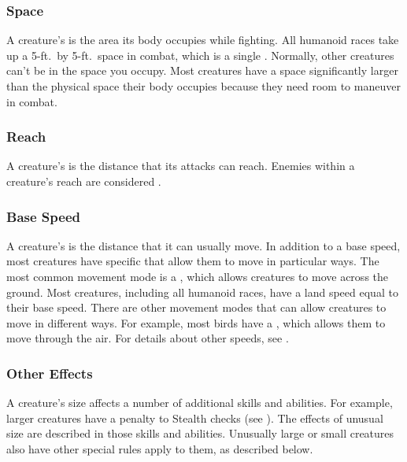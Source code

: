         \subsubsection{Space}\label{Space}
            A creature's  is the area its body occupies while fighting.
            All humanoid races take up a 5-ft.\ by 5-ft.\ space in combat, which is a single .
            Normally, other creatures can't be in the space you occupy.
            Most creatures have a space significantly larger than the physical space their body occupies because they need room to maneuver in combat.

        \subsubsection{Reach}\label{Reach}
            A creature's  is the distance that its  attacks can reach.
            Enemies within a creature's reach are considered .

        \subsubsection{Base Speed}\label{Base Speed}
            A creature's  is the distance that it can usually move.
            In addition to a base speed, most creatures have specific  that allow them to move in particular ways.
            The most common movement mode is a , which allows creatures to move across the ground.
            Most creatures, including all humanoid races, have a land speed equal to their base speed.
            There are other movement modes that can allow creatures to move in different ways.
            For example, most birds have a , which allows them to move through the air.
            For details about other speeds, see .

        \subsubsection{Other Effects}
            A creature's size affects a number of additional skills and abilities.
            For example, larger creatures have a penalty to Stealth checks (see ).
            The effects of unusual size are described in those skills and abilities.
            Unusually large or small creatures also have other special rules apply to them, as described below.

